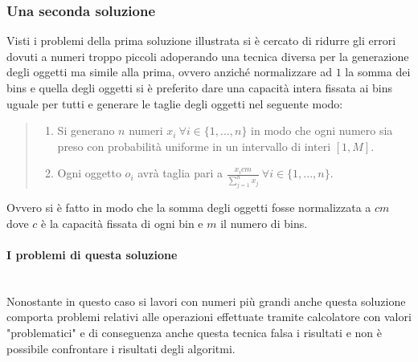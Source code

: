 \subsubsection{Una seconda soluzione}
Visti i problemi della prima soluzione illustrata si è cercato di ridurre gli errori dovuti a numeri troppo piccoli adoperando
una tecnica diversa per la generazione degli oggetti ma simile alla prima, ovvero anziché normalizzare ad $ 1 $ la somma dei bins 
e quella degli oggetti si è preferito dare una capacità intera fissata ai bins uguale per tutti e generare le taglie degli oggetti nel
seguente modo:
\begin{quote}
	\begin{enumerate}
		\item Si generano $ n $ numeri $ x_i \: \forall i \in \{1, ..., n\} $ in modo che ogni numero sia preso con probabilità 
			  uniforme in un intervallo di interi $ [1, M] $.
		\item Ogni oggetto $ o_i $ avrà taglia pari a $ \displaystyle\frac{x_i cm}{\sum_{j=1}^n x_j} \: \forall i \in \{1, ..., n\} $. 
	\end{enumerate}
\end{quote}
Ovvero si è fatto in modo che la somma degli oggetti fosse normalizzata a $ cm $ dove $ c $ è la capacità fissata
di ogni bin e $ m $ il numero di bins.

\paragraph{I problemi di questa soluzione}\mbox{}\\
Nonostante in questo caso si lavori con numeri più grandi anche questa soluzione comporta problemi relativi
alle operazioni effettuate tramite calcolatore con valori "problematici" e di conseguenza anche questa tecnica falsa i risultati e non è possibile confrontare
i risultati degli algoritmi.


